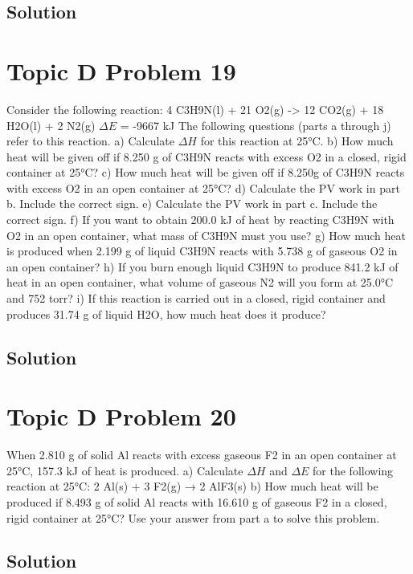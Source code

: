 \documentclass[10pt]{article}
\begin{document}
        
        \subsection{Solution}

    \pagebreak
    \section{Topic D Problem 19}
        Consider the following reaction:
4 C3H9N(l) + 21 O2(g) -> 12 CO2(g) + 18 H2O(l) + 2 N2(g) $\Delta E$ = -9667 kJ
The following questions (parts a through j) refer to this reaction.
a) Calculate $\Delta H$ for this reaction at 25\unit{\celsius}.
b) How much heat will be given off if 8.250 g of C3H9N reacts with excess O2 in a closed,
rigid container at 25\unit{\celsius}?
c) How much heat will be given off if 8.250g of C3H9N reacts with excess O2 in an open
container at 25\unit{\celsius}?
d) Calculate the PV work in part b. Include the correct sign.
e) Calculate the PV work in part c. Include the correct sign.
f) If you want to obtain 200.0 kJ of heat by reacting C3H9N with O2 in an open container,
what mass of C3H9N must you use?
g) How much heat is produced when 2.199 g of liquid C3H9N reacts with 5.738 g of gaseous
O2 in an open container?
h) If you burn enough liquid C3H9N to produce 841.2 kJ of heat in an open container, what
volume of gaseous N2 will you form at 25.0\unit{\celsius} and 752 torr?
i) If this reaction is carried out in a closed, rigid container and produces 31.74 g of liquid
H2O, how much heat does it produce?
        
        \subsection{Solution}

    \pagebreak
    \section{Topic D Problem 20}
        When 2.810 g of solid Al reacts with excess gaseous F2 in an open container at 25\unit{\celsius}, 157.3
kJ of heat is produced.
a) Calculate $\Delta H$ and $\Delta E$ for the following reaction at 25\unit{\celsius}:
2 Al(s) + 3 F2(g) → 2 AlF3(s)
b) How much heat will be produced if 8.493 g of solid Al reacts with 16.610 g of gaseous F2
in a closed, rigid container at 25\unit{\celsius}? Use your answer from part a to solve this problem.
        
        \subsection{Solution}
\end{document}
